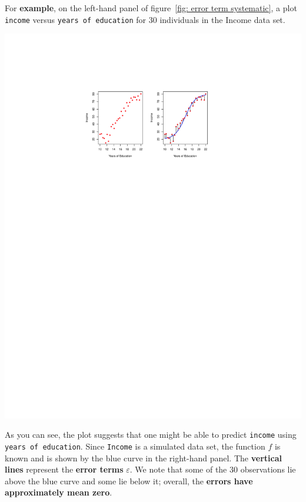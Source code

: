 \documentclass[a4paper]{article}
\newcommand{\example}[1]{\textcolor{Green4}{\textbf{#1}}}
\begin{document}
    \begin{examplebox}
        For \example{example}, on the left-hand panel of figure~\ref{fig: error term systematic}, a plot \texttt{income} versus \texttt{years of education} for 30 individuals in the Income data set.
        
        \begin{center}
            \includegraphics[width=\textwidth]{img/error-term-systematic-1.pdf}
            \label{fig: error term systematic}
        \end{center}


        \noindent
        As you can see, the plot suggests that one might be able to predict \texttt{income} using \texttt{years of education}. Since \texttt{Income} is a simulated data set, the function $f$ is known and is shown by the blue curve in the right-hand panel. The \textbf{vertical lines} represent the \textbf{error terms} $\varepsilon$. We note that some of the 30 observations lie above the blue curve and some lie below it; overall, the \textbf{errors have approximately mean zero}.
    \end{examplebox}
\end{document}

